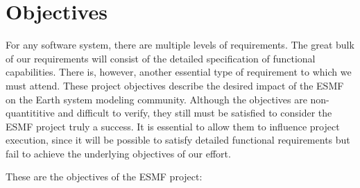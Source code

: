 \section{Objectives}


For any software system, there are multiple levels of requirements.
The great bulk of our requirements will consist of the detailed
specification of functional capabilities.  There is, however,
another essential type of requirement to which we must attend.  
These project objectives describe the desired impact of the
ESMF on the Earth system modeling community.  Although the objectives 
are non-quantititive and difficult to verify, they still must be 
satisfied to consider the ESMF project truly a success.  It
is essential to allow them to influence project execution, since
it will be possible to satisfy detailed functional
requirements but fail to achieve the underlying objectives of 
our effort.

\newpage
These are the objectives of the ESMF project:

